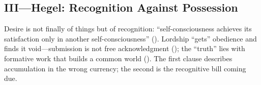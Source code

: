 \subsection*{III—Hegel: Recognition Against Possession}
\label{ssec:iii-hegel}
Desire is not finally of things but of recognition: “self-consciousness achieves its satisfaction only in another self-consciousness” (\parencite[\S175]{HegelPhenomenology1977}). Lordship “gets” obedience and finds it void—submission is not free acknowledgment (\parencite[\S\S187--189]{HegelPhenomenology1977}); the “truth” lies with formative work that builds a common world (\parencite[\S196]{HegelPhenomenology1977}). The first clause describes accumulation in the wrong currency; the second is the recognitive bill coming due.
